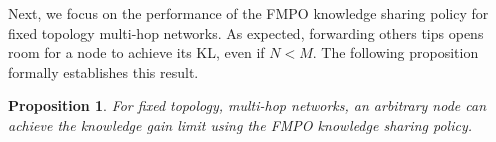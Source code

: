 \documentclass[12pt,epsf]{article}
\newtheorem{prop}{Proposition}
\theoremstyle{definition}
\begin{document}
Next, we focus on the performance of the FMPO knowledge sharing policy 
for fixed topology multi-hop networks. As expected, forwarding others tips opens room for a node to achieve its KL, even if $N<M$. The following proposition formally establishes this result. 
%
\vspace{-0.2 cm}
\begin{prop}
For fixed topology, multi-hop networks, an arbitrary node can achieve the knowledge gain limit using the FMPO knowledge sharing policy.
\end{prop}
%
\end{document}

